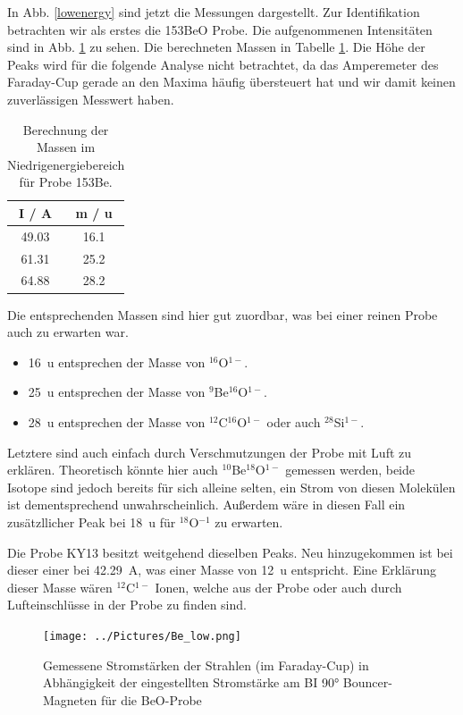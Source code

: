 In Abb. \ref{lowenergy} sind jetzt die Messungen dargestellt.
Zur Identifikation betrachten wir als erstes die 153BeO Probe.
Die aufgenommenen Intensitäten sind in Abb. \ref{Probe_Be} zu sehen.
Die berechneten Massen in Tabelle \ref{153Be}.
Die Höhe der Peaks wird für die folgende Analyse nicht betrachtet, da das Amperemeter des Faraday-Cup gerade an den Maxima häufig übersteuert hat und wir damit keinen zuverlässigen Messwert haben.
\begin{table}[h]
    \centering
    \caption{Berechnung der Massen im Niedrigenergiebereich für Probe 153Be.}
    \begin{tabular}{|c |c|}
        \hline
        I / \si{\ampere} & m / \si{\atomicmassunit} \\
        \hline
        \num{49.03} & \num{16.1} \\
        \num{61.31} & \num{25.2} \\
        \num{64.88} & \num{28.2} \\
        \hline
    \end{tabular}
    \label{153Be}
\end{table}
Die entsprechenden Massen sind hier gut zuordbar, was bei einer reinen Probe auch zu erwarten war.
\begin{itemize}
    \item \SI{16}{\atomicmassunit} entsprechen der Masse von $^{16}$O$^{1-}$.
    \item \SI{25}{\atomicmassunit} entsprechen der Masse von $^{9}$Be$^{16}$O$^{1-}$.
    \item \SI{28}{\atomicmassunit} entsprechen der Masse von $^{12}$C$^{16}$O$^{1-}$ oder auch $^{28}$Si$^{1-}$.
\end{itemize}
Letztere sind auch einfach durch Verschmutzungen der Probe mit Luft zu erklären.
Theoretisch könnte hier auch $^{10}$Be$^{18}$O$^{1-}$ gemessen werden, beide Isotope sind jedoch bereits für sich alleine selten, ein Strom von diesen Molekülen ist dementsprechend unwahrscheinlich.
Außerdem wäre in diesen Fall ein zusätzllicher Peak bei \SI{18}{\atomicmassunit} für $^{18}$O$^{-1}$ zu erwarten.

Die Probe KY13 besitzt weitgehend dieselben Peaks.
Neu hinzugekommen ist bei dieser einer bei \SI{42.29}{\ampere}, was einer Masse von \SI{12}{\atomicmassunit} entspricht.
Eine Erklärung dieser Masse wären $^{12}$C$^{1-}$ Ionen, welche aus der Probe oder auch durch Lufteinschlüsse in der Probe zu finden sind.
\begin{figure}[ht]
	\centering
           \texttt{[image: ../Pictures/Be\_low.png]}
	\caption{Gemessene Stromstärken der Strahlen (im Faraday-Cup) in Abhängigkeit der eingestellten Stromstärke am BI \ang{90} Bouncer-Magneten für die BeO-Probe}
	\label{Probe_Be}
\end{figure}

